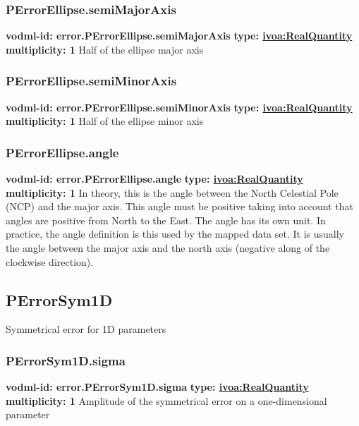     \subsubsection{PErrorEllipse.semiMajorAxis}
      \textbf{vodml-id: error.PErrorEllipse.semiMajorAxis} \newline
      \textbf{type: \hyperref[sect:ivoa]{ivoa:RealQuantity}} \newline
      \textbf{multiplicity: 1} \newline
      Half of the ellipse major axis

    \subsubsection{PErrorEllipse.semiMinorAxis}
      \textbf{vodml-id: error.PErrorEllipse.semiMinorAxis} \newline
      \textbf{type: \hyperref[sect:ivoa]{ivoa:RealQuantity}} \newline
      \textbf{multiplicity: 1} \newline
      Half of the ellipse minor axis

    \subsubsection{PErrorEllipse.angle}
      \textbf{vodml-id: error.PErrorEllipse.angle} \newline
      \textbf{type: \hyperref[sect:ivoa]{ivoa:RealQuantity}} \newline
      \textbf{multiplicity: 1} \newline
      In theory, this is the angle between the North Celestial Pole (NCP) and the major axis. This angle must be positive taking into account that angles are positive from North to the East. The angle has its own unit. In practice, the angle definition is this used by the mapped data set. It is usually the angle between the major axis and the north axis (negative along of the clockwise direction).

  \subsection{PErrorSym1D}
  \label{sect:error.PErrorSym1D}
    Symmetrical error for 1D parameters

    \subsubsection{PErrorSym1D.sigma}
      \textbf{vodml-id: error.PErrorSym1D.sigma} \newline
      \textbf{type: \hyperref[sect:ivoa]{ivoa:RealQuantity}} \newline
      \textbf{multiplicity: 1} \newline
      Amplitude of the symmetrical error on a one-dimensional parameter


